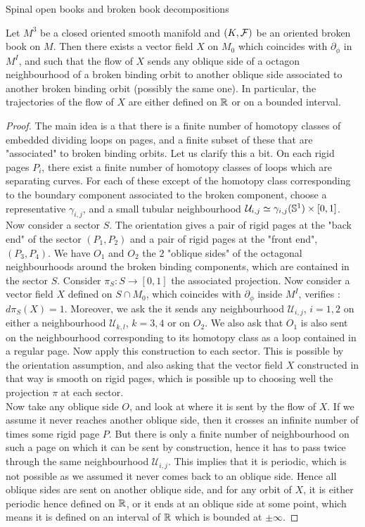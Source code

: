 \documentclass[../main.tex]{subfiles}
\begin{document}
\begin{section}{Spinal open books and broken book decompositions}
\begin{lemma}
Let $M^3$ be a closed oriented smooth manifold and $(K,\mathcal{F})$ be an oriented broken book on $M$. Then there exists a vector field $X$ on $M_0$ which coincides with $\partial_\phi$ in $M^I$, and such that the flow of $X$ sends any oblique side of a octagon neighbourhood of a broken binding orbit to another oblique side associated to another broken binding orbit (possibly the same one). In particular, the trajectories of the flow of $X$ are either defined on $\mathbb{R}$ or on a bounded interval.
\end{lemma}


\begin{proof}
The main idea is a that there is a finite number of homotopy classes of embedded dividing loops on pages, and a finite subset of these that are "associated" to broken binding orbits. Let us clarify this a bit. On each rigid pages $P_i$, there exist a finite number of homotopy classes of loops which are separating curves. For each of these except of the homotopy class corresponding to the boundary component associated to the broken component, choose a representative $\gamma_{i,j}$, and a small tubular neighbourhood $\mathcal{U}_{i,j}\simeq \gamma_{i,j}(\mathbb{S}^1)\times[0,1]$. Now consider a sector $S$. The orientation gives a pair of rigid pages at the "back end" of the sector $(P_1,P_2)$ and a pair of rigid pages at the "front end", $(P_3,P_4)$. We have $O_1$ and $O_2$ the $2$ "oblique sides" of the octagonal neighbourhoods around the broken binding components, which are contained in the sector $S$. Consider $\pi_S :S \rightarrow [0,1]$ the associated projection. Now consider a vector field $X$ defined on $S\cap M_0$, which coincides with $\partial_\phi$ inside $M^I$, verifies : $d\pi_S(X) = 1$. Moreover, we ask the it sends any neighbourhood $\mathcal{U}_{i,j}$, $i = 1,2$ on either a neighbourhood $\mathcal{U}_{k,l}$, $k = 3,4$ or on $O_2$. We also ask that $O_1$ is also sent on the neighbourhood corresponding to its homotopy class as a loop contained in a regular page. Now apply this construction to each sector. This is possible by the orientation assumption, and also asking that the vector field $X$ constructed in that way is smooth on rigid pages, which is possible up to choosing well the projection $\pi$ at each sector. \\
Now take any oblique side $O$, and look at where it is sent by the flow of $X$. If we assume it never reaches another oblique side, then it crosses an infinite number of times some rigid page $P$. But there is only a finite number of neighbourhood on such a page on which it can be sent by construction, hence it has to pass twice through the same neighbourhood $\mathcal{U}_{i,j}$. This implies that it is periodic, which is not possible as we assumed it never comes back to an oblique side. Hence all oblique sides are sent on another oblique side, and for any orbit of $X$, it is either periodic hence defined on $\mathbb{R}$, or it ends at an oblique side at some point, which means it is defined on an interval of $\mathbb{R}$ which is bounded at $\pm \infty$.





\end{proof}
\end{section}
\end{document}
